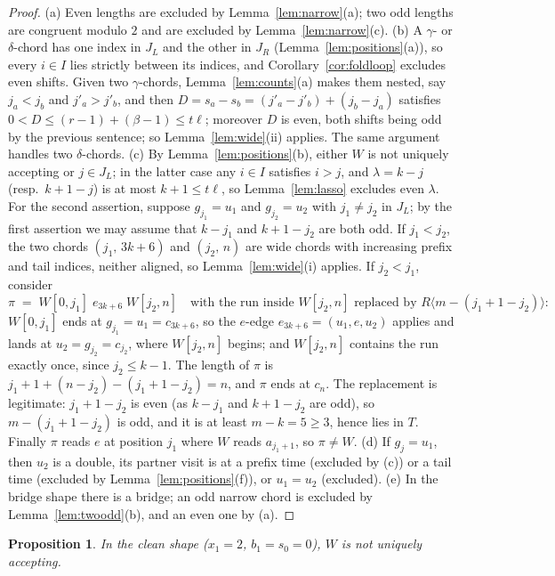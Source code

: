 \documentclass[11pt]{article}
\newtheorem{proposition}[theorem]{Proposition}
\theoremstyle{definition}
\begin{document}
\begin{proof}
(a) Even lengths are excluded by Lemma~\ref{lem:narrow}(a); two odd lengths
are congruent modulo $2$ and are excluded by Lemma~\ref{lem:narrow}(c).
(b) A $\gamma$- or $\delta$-chord has one index in $J_L$ and the other in
$J_R$ (Lemma~\ref{lem:positions}(a)), so every $i\in I$ lies strictly
between its indices, and Corollary~\ref{cor:foldloop} excludes even
shifts. Given two $\gamma$-chords, Lemma~\ref{lem:counts}(a) makes them
nested, say $j_a<j_b$ and $j'_a>j'_b$, and then
$D=s_a-s_b=(j'_a-j'_b)+(j_b-j_a)$ satisfies
$0<D\le(r-1)+(\beta-1)\le t\ell$; moreover $D$ is even, both shifts being
odd by the previous sentence; so Lemma~\ref{lem:wide}(ii) applies. The
same argument handles two $\delta$-chords.
(c) By Lemma~\ref{lem:positions}(b), either $W$ is not uniquely
accepting or $j\in J_L$; in the latter case any $i\in I$ satisfies $i>j$,
and $\lambda=k-j$ (resp.\ $k+1-j$) is at most $k+1\le t\ell$, so
Lemma~\ref{lem:lasso} excludes even $\lambda$. For the second assertion,
suppose $g_{j_1}=u_1$ and $g_{j_2}=u_2$ with $j_1\ne j_2$ in $J_L$; by the
first assertion we may assume that $k-j_1$ and $k+1-j_2$ are both odd. If
$j_1<j_2$, the two chords $(j_1,\,3k+6)$ and $(j_2,\,n)$ are wide chords
with increasing prefix and tail indices, neither aligned, so
Lemma~\ref{lem:wide}(i) applies. If $j_2<j_1$, consider
\[
\pi\;=\;W[0,j_1]\;e_{3k+6}\;W[j_2,n]\quad\text{with the run inside $W[j_2,n]$ replaced by }
R\bigl\langle m-(j_1+1-j_2)\bigr\rangle :
\]
$W[0,j_1]$ ends at $g_{j_1}=u_1=c_{3k+6}$, so the $e$-edge
$e_{3k+6}=(u_1,e,u_2)$ applies and lands at $u_2=g_{j_2}=c_{j_2}$, where
$W[j_2,n]$ begins; and $W[j_2,n]$ contains the run exactly once, since
$j_2\le k-1$. The length of $\pi$ is
$j_1+1+(n-j_2)-(j_1+1-j_2)=n$, and $\pi$ ends at $c_n$. The replacement is
legitimate: $j_1+1-j_2$ is even (as $k-j_1$ and $k+1-j_2$ are odd), so
$m-(j_1+1-j_2)$ is odd, and it is at least $m-k=5\ge3$, hence lies in
$T$. Finally $\pi$ reads $e$ at position $j_1$ where $W$ reads
$a_{j_1+1}$, so $\pi\ne W$.
(d) If $g_j=u_1$, then $u_2$ is a double, its partner visit is at a prefix
time (excluded by (c)) or a tail time (excluded by Lemma~\ref{lem:positions}(f)),
or $u_1=u_2$ (excluded).
(e) In the bridge shape there is a bridge; an odd narrow chord is excluded by
Lemma~\ref{lem:twoodd}(b), and an even one by (a).
\end{proof}

\begin{proposition}\label{prop:ell2clean}
In the clean shape ($x_1=2$, $b_1=s_0=0$), $W$ is not uniquely accepting.
\end{proposition}
\end{document}
